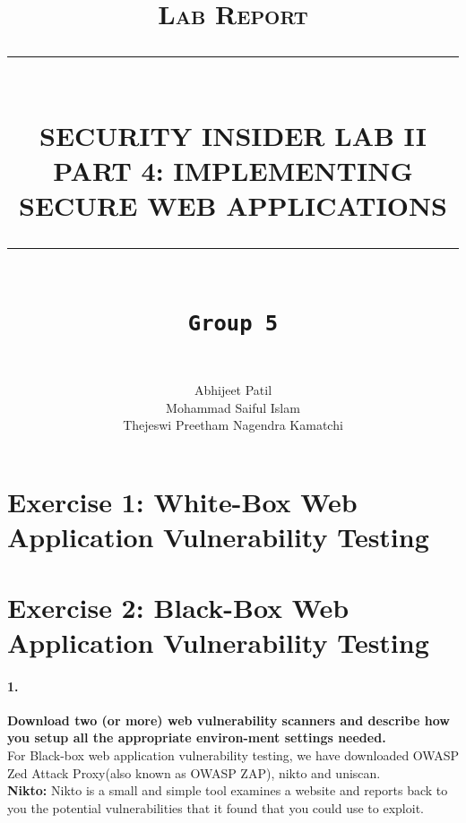 \documentclass[12pt]{report}
\newcommand{\HRule}[1]{\rule{\linewidth}{#1}}
\begin{document}
	
	\title{ \normalsize \textsc{Lab Report}
		\\ [2.0cm]
		\HRule{0.5pt} \\
		\LARGE \textbf{\uppercase{Security Insider Lab II \\
				Part 4: Implementing Secure Web Applications}}
		\HRule{2pt} \\ [0.5cm]
		\normalsize \vspace*{4\baselineskip}
		\LARGE {\tt Group 5}\\}
	\date{}
	\author{
		 \\
		Abhijeet Patil \\
		Mohammad Saiful Islam\\
		Thejeswi Preetham Nagendra Kamatchi}
	\maketitle
	\newpage
	
	
	\section*{Exercise 1: White-Box Web Application Vulnerability Testing}
	\newpage
	
	\section*{Exercise 2: Black-Box Web Application Vulnerability Testing}
	
	\paragraph*{1.}{\bf Download two (or more) web vulnerability scanners and describe how you setup all the appropriate environ-ment settings needed.}\\
	
	For Black-box web application vulnerability testing, we have downloaded OWASP Zed Attack Proxy(also known as OWASP ZAP), nikto and uniscan.\\
	
	{\bf Nikto:} Nikto is a small and simple tool examines a website and reports back to you the potential vulnerabilities that it found that you could use to exploit. 
	
\end{document}
